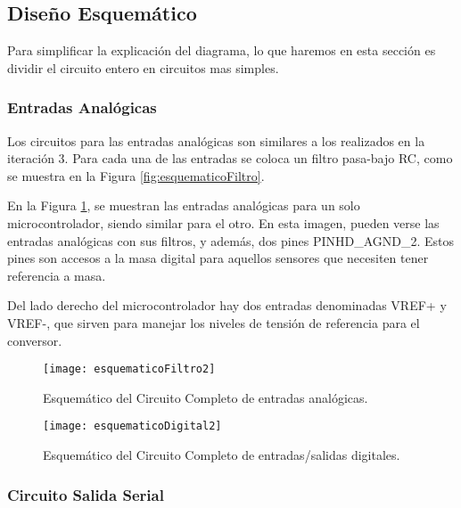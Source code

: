 \subsection{Diseño Esquemático}
\label{it5:sub:diseño_esquematico2}

Para simplificar la explicación del diagrama, lo que haremos en esta sección es dividir el circuito entero en circuitos mas simples.

\subsubsection{Entradas Analógicas}
\label{it5:subs:entradas_analogicas2}

Los circuitos para las entradas analógicas son similares a los realizados en la iteración 3. Para cada una de las entradas se coloca un filtro pasa-bajo RC, como se muestra en la Figura \ref{fig:esquematicoFiltro}.

En la Figura \ref{fig:esquematicoFiltro2}, se muestran las entradas analógicas para un solo microcontrolador, siendo similar para el otro. En esta imagen, pueden verse las entradas analógicas con sus filtros, y además, dos pines PINHD\_AGND\_2. Estos pines son accesos a la masa digital para aquellos sensores que necesiten tener referencia a masa.

Del lado derecho del microcontrolador hay dos entradas denominadas VREF+ y VREF-, que sirven para manejar los niveles de tensión de referencia para el conversor.

\begin{figure}[h]
\centering
  \texttt{[image: esquematicoFiltro2]}
  \caption{Esquemático del Circuito Completo de entradas analógicas.}\label{fig:esquematicoFiltro2}
\end{figure}



\begin{figure}[h]
\centering
  \texttt{[image: esquematicoDigital2]}
  \caption{Esquemático del Circuito Completo de entradas/salidas digitales.}\label{fig:esquematicoDigital2}
\end{figure}



\subsubsection{Circuito Salida Serial}
\label{it5:subs:salida_serial2}

